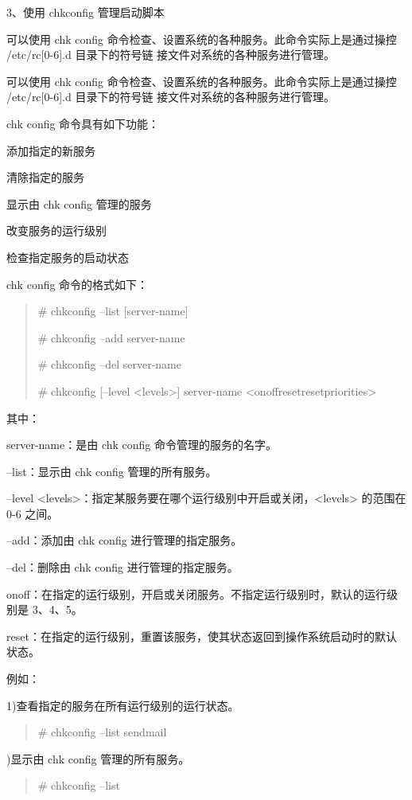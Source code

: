 \documentclass[letterpaper,10pt]{sphinxmanual}
\begin{document}
3、使用 chkconfig 管理启动脚本

可以使用 chk config 命令检查、设置系统的各种服务。此命令实际上是通过操控 /etc/rc{[}0-6{]}.d 目录下的符号链
接文件对系统的各种服务进行管理。

可以使用 chk config 命令检查、设置系统的各种服务。此命令实际上是通过操控 /etc/rc{[}0-6{]}.d 目录下的符号链
接文件对系统的各种服务进行管理。

chk config 命令具有如下功能：

添加指定的新服务

清除指定的服务

显示由 chk config 管理的服务

改变服务的运行级别

检查指定服务的启动状态

chk config 命令的格式如下：
\begin{quote}

\# chkconfig --list {[}server-name{]}

\# chkconfig --add server-name

\# chkconfig --del server-name

\# chkconfig {[}--level \textless{}levels\textgreater{}{]} server-name \textless{}on\textbar{}off\textbar{}reset\textbar{}resetpriorities\textgreater{}
\end{quote}

其中：

server-name：是由 chk config 命令管理的服务的名字。

--list：显示由 chk config 管理的所有服务。

--level \textless{}levels\textgreater{}：指定某服务要在哪个运行级别中开启或关闭，\textless{}levels\textgreater{} 的范围在 0-6 之间。

--add：添加由 chk config 进行管理的指定服务。

--del：删除由 chk config 进行管理的指定服务。

on\textbar{}off：在指定的运行级别，开启或关闭服务。不指定运行级别时，默认的运行级别是 3、4、5。

reset：在指定的运行级别，重置该服务，使其状态返回到操作系统启动时的默认状态。

例如：

1)查看指定的服务在所有运行级别的运行状态。
\begin{quote}

\# chkconfig --list sendmail
\end{quote}

)显示由 chk config 管理的所有服务。
\begin{quote}

\# chkconfig --list
\end{quote}
\end{document}

